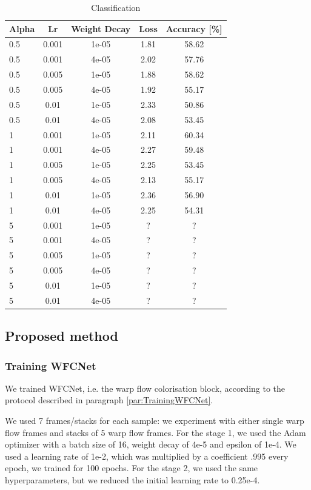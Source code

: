 \documentclass[10pt,twocolumn,letterpaper]{article}
\begin{document}
\begin{table}[h!]
	\begin{center}
		\begin{tabular}{lcc|cc}
			\textbf{Alpha} & \textbf{Lr} & \textbf{Weight Decay} & \textbf{Loss} & \textbf{Accuracy [\%]}\\
			\hline
			0.5&0.001&1e-05&1.81&58.62\\
			0.5&0.001&4e-05&2.02&57.76\\
			0.5&0.005&1e-05&1.88&58.62\\
			0.5&0.005&4e-05&1.92&55.17\\
			0.5&0.01&1e-05&2.33&50.86\\
			0.5&0.01&4e-05&2.08&53.45\\
			1&0.001&1e-05&2.11&60.34\\
			1&0.001&4e-05&2.27&59.48\\
			1&0.005&1e-05&2.25&53.45\\
			1&0.005&4e-05&2.13&55.17\\
			1&0.01&1e-05&2.36&56.90\\
			1&0.01&4e-05&2.25&54.31\\
			5&0.001&1e-05&?&?\\
			5&0.001&4e-05&?&?\\
			5&0.005&1e-05&?&?\\
			5&0.005&4e-05&?&?\\
			5&0.01&1e-05&?&?\\
			5&0.01&4e-05&?&?\\
			\hline
		\end{tabular}
	\end{center}	
	\caption{Classification}
\end{table}

\subsection{Proposed method}

\subsubsection{Training WFCNet}

We trained WFCNet, i.e. the warp flow colorisation block, according to the protocol described in paragraph \ref{par:TrainingWFCNet}.

We used 7 frames/stacks for each sample: we experiment with either single warp flow frames and stacks of 5 warp flow frames. For the stage 1, we used the Adam optimizer with a batch size of 16, weight decay of 4e-5 and epsilon of 1e-4. We used a learning rate of 1e-2, which was multiplied by a coefficient .995 every epoch, we trained for 100 epochs. For the stage 2, we used the same hyperparameters, but we reduced the initial learning rate to 0.25e-4.
\end{document}
